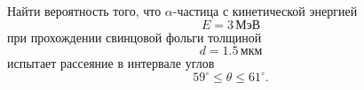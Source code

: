 \documentclass[../final.tex]{subfiles}
\begin{document}







\condition
Найти вероятность того, что $\alpha$-частица с кинетической энергией
%
\begin{equation*}
    E=3\,\text{МэВ}
\end{equation*}
%
при прохождении свинцовой фольги толщиной
%
\begin{equation*}
    d=1.5\,\text{мкм}
\end{equation*}
%
испытает рассеяние в интервале углов
%
\begin{equation*}
    59^\circ\leqslant\theta\leqslant61^\circ.
\end{equation*}


\end{document}
